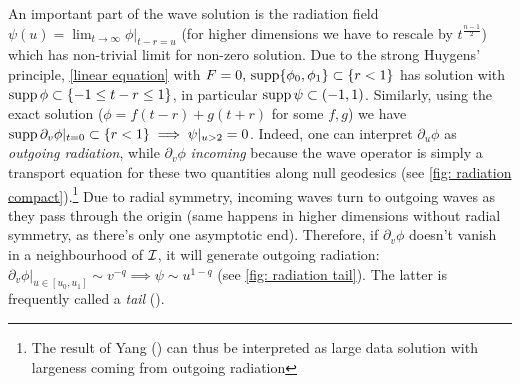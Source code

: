\documentclass[11pt, oneside]{amsart}
\begin{document}
	\begin{figure}[h]
		\centering
		\qquad
		\label{fig:diagram comparison}
	\end{figure}
	
	An important part of the wave solution is the radiation field $\psi(u)=\lim_{t\to\infty}\phi|_{t-r=u}$ (for higher dimensions we have to rescale by $t^{\frac{n-1}{2}}$) which has non-trivial limit for non-zero solution. Due to the strong Huygens' principle, \eqref{linear equation} with $F=0,\,\operatorname{supp}\{\phi_0,\phi_1\}\subset \{r<1\}$ has solution with $\operatorname{supp}\phi\subset \{-1\leq t-r\leq 1\}$, in particular $\operatorname{supp}\psi\subset(-1,1)$. Similarly, using the exact solution ($\phi=f(t-r)+g(t+r)$ for some $f,g$) we have $\operatorname{supp}\partial_v\phi|_{t=0}\subset\{r<1\}\implies \psi|_{u>2}=0$. Indeed, one can interpret $\partial_u\phi$ as \textit{outgoing radiation}, while $\partial_v\phi$ \textit{incoming} because the wave operator is simply a transport equation for these two quantities along null geodesics (see \cref{fig: radiation compact}).\footnote{The result of Yang (\cite{yang_global_2013}) can thus be interpreted as large data solution with largeness coming from outgoing radiation} Due to radial symmetry, incoming waves turn to outgoing waves as they pass through the origin (same happens in higher dimensions without radial symmetry, as there's only one asymptotic end). Therefore, if $\partial_v\phi$ doesn't vanish in a neighbourhood of $\mathcal{I}$, it will generate outgoing radiation: $\partial_v\phi|_{u\in[u_0,u_1]}\sim v^{-q}\implies\psi\sim u^{1-q}$ (see \cref{fig: radiation tail}). The latter is frequently called a \textit{tail} (\cite{angelopoulos_asymptotics_2018}).
	
	
	\begin{figure}[h]
	\end{figure}
\end{document}
